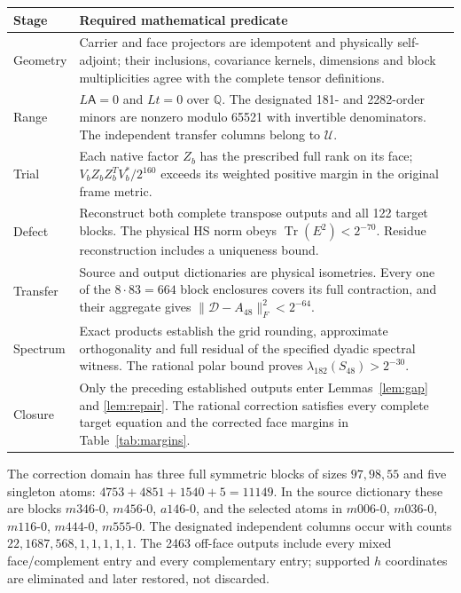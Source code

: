 \documentclass[11pt,a4paper]{article}
\theoremstyle{definition}\newtheorem{definition}[theorem]{Definition}
\theoremstyle{remark}\newtheorem{remark}[theorem]{Remark}
\DeclareMathOperator{\Tr}{Tr}\DeclareMathOperator{\rank}{rank}
\numberwithin{equation}{section}
\begin{document}
\begin{longtable}{@{}p{.11\linewidth}p{.81\linewidth}@{}}
\toprule
Stage & Required mathematical predicate\\
\midrule
\endhead
Geometry &
Carrier and face projectors are idempotent and physically self-adjoint;
their inclusions, covariance kernels, dimensions and block multiplicities
agree with the complete tensor definitions.\\[5pt]
Range &
$L\mathsf A=0$ and $Lt=0$ over $\mathbb Q$.
The designated 181- and 2282-order minors are nonzero modulo 65521
with invertible denominators. The independent transfer columns belong
to $\mathcal U$.\\[5pt]
Trial &
Each native factor $Z_b$ has the prescribed full rank on its face;
$V_bZ_bZ_b^TV_b^*/2^{160}$ exceeds its weighted positive margin in
the original frame metric.\\[5pt]
Defect &
Reconstruct both complete transpose outputs and all 122 target blocks.
The physical HS norm obeys $\Tr(E^2)<2^{-70}$.
Residue reconstruction includes a uniqueness bound.\\[5pt]
Transfer &
Source and output dictionaries are physical isometries.
Every one of the $8\cdot83=664$ block enclosures covers its full
contraction, and their aggregate gives
$\|\mathcal D-A_{48}\|_F^2<2^{-64}$.\\[5pt]
Spectrum &
Exact products establish the grid rounding, approximate
orthogonality and full residual of the specified dyadic spectral
witness. The rational polar bound proves
$\lambda_{182}(S_{48})>2^{-30}$.\\[5pt]
Closure &
Only the preceding established outputs enter
Lemmas~\ref{lem:gap} and \ref{lem:repair}.
The rational correction satisfies every complete target equation
and the corrected face margins in Table~\ref{tab:margins}.\\
\bottomrule
\end{longtable}

The correction domain has three full symmetric blocks of sizes
$97,98,55$ and five singleton atoms:
$4753+4851+1540+5=11149$.
In the source dictionary these are blocks
$m346$-$0$, $m456$-$0$, $a146$-$0$, and the selected atoms in
$m006$-$0$, $m036$-$0$, $m116$-$0$, $m444$-$0$, $m555$-$0$.
The designated independent columns occur with counts
$22,1687,568,1,1,1,1,1$.
The 2463 off-face outputs include every mixed face/complement
entry and every complementary entry; supported $h$ coordinates
are eliminated and later restored, not discarded.
\end{document}
